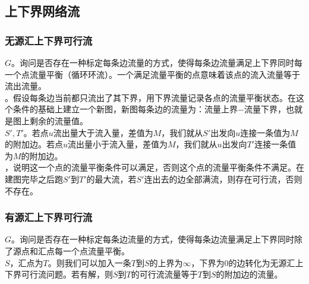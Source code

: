 \documentclass[a4paper]{book}
\begin{document}
\subsection{上下界网络流}
\subsubsection{无源汇上下界可行流}
$G$。询问是否存在一种标定每条边流量的方式，使得每条边流量满足上下界同时每一个点流量平衡（循环环流）。一个满足流量平衡的点意味着该点的流入流量等于流出流量。\\
。假设每条边当前都只流出了其下界，用下界流量记录各点的流量平衡状态。在这个条件的基础上建立一个新图，新图每条边的流量为：流量上界$-$流量下界，也就是图上剩余的流量值。\\
$S',T'$。若点$u$流出量大于流入量，差值为$M$，我们就从$S'$出发向$u$连接一条值为$M$的附加边。若点$u$流出量小于流入量，差值为$M$，我们就从$u$出发向$T'$连接一条值为$M$的附加边。\\
，说明这一个点的流量平衡条件可以满足，否则这个点的流量平衡条件不满足。在建图完毕之后跑$S'$到$T'$的最大流，若$S'$连出去的边全部满流，则存在可行流，否则不存在。
\subsubsection{有源汇上下界可行流}
$G$。询问是否存在一种标定每条边流量的方式，使得每条边流量满足上下界同时除了源点和汇点每一个点流量平衡。\\
$S$，汇点为$T$。则我们可以加入一条$T$到$S$的上界为$\infty$，下界为$0$的边转化为无源汇上下界可行流问题。若有解，则$S$到$T$的可行流流量等于$T$到$S$的附加边的流量。
\end{document}
